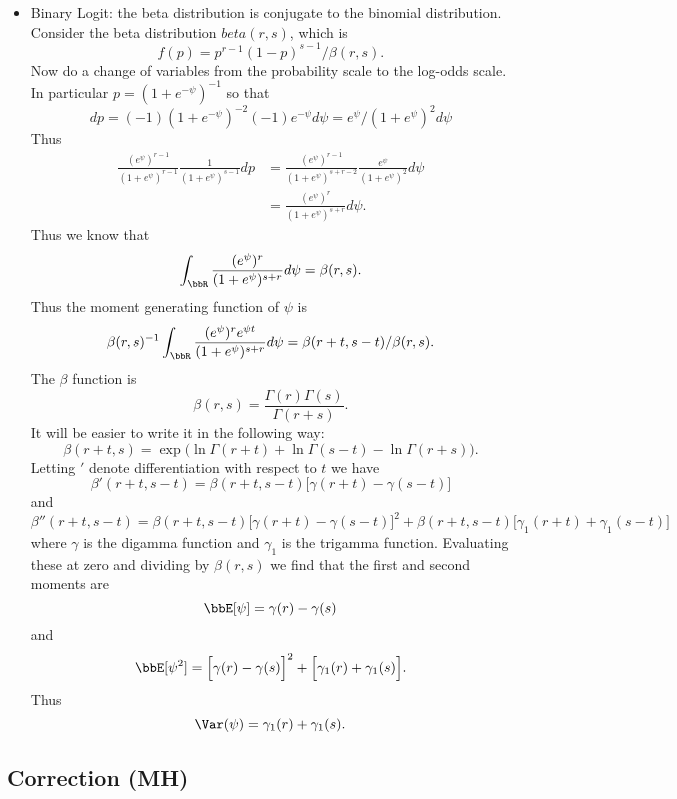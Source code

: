\documentclass{article}
\begin{document}
\begin{itemize}
\item Binary Logit: the beta distribution is conjugate to the binomial
  distribution.  Consider the beta distribution $beta(r, s)$, which is
  \[
  f(p) = p^{r-1} (1-p)^{s-1} / \beta(r, s).
  \]
  Now do a change of variables from the probability scale to the log-odds
  scale.  In particular $p = (1 + e^{-\psi})^{-1}$ so that
  \[
  dp = (-1) (1 + e^{-\psi})^{-2} (-1) e^{-\psi} d \psi = e^{\psi} /
  (1+e^{\psi})^2 d \psi
  \]
  Thus
  \begin{align*}
  \frac{(e^{\psi})^{r-1}}{(1+e^\psi)^{r-1}}  \frac{1}{(1+e^\psi)^{s-1}} d p
  & = 
  \frac{(e^{\psi})^{r-1}}{(1+e^{\psi})^{s+r-2}} \frac{e^{\psi}}{(1+e^{\psi})^2} d
  \psi \\
  & = \frac{(e^{\psi})^{r}}{(1+e^{\psi})^{s+r}} d \psi.
  \end{align*}
  Thus we know that
  \[
  \int_\bbR  \frac{(e^{\psi})^{r}}{(1+e^{\psi})^{s+r}} d \psi = \beta(r, s).
  \]
  Thus the moment generating function of $\psi$ is
  \[
  \beta(r,s)^{-1} \int_{\bbR} \frac{(e^{\psi})^{r}e^{\psi
      t}}{(1+e^{\psi})^{s+r}} d \psi 
  = \beta(r+t, s-t) / \beta(r,s).
  \]
  The $\beta$ function is
  \[
  \beta(r,s) = \frac{\Gamma(r) \Gamma(s)}{\Gamma(r+s)}.
  \]
  It will be easier to write it in the following way:
  \[
  \beta(r+t, s) = \exp \Big( \ln \Gamma(r+t) + \ln \Gamma(s-t) - \ln \Gamma(r+s) \Big).
  \]
  Letting $'$ denote differentiation with respect to $t$ we have
  \[
  \beta'(r+t, s-t) = \beta(r+t, s-t) \Big[ \gamma(r+t) - \gamma(s-t) \Big]
  \]
  and
  \[
  \beta''(r+t, s-t) = \beta(r+t, s-t) \Big[ \gamma(r+t) - \gamma(s-t) \Big]^2
  + \beta(r+t, s-t) \Big[ \gamma_1(r+t) + \gamma_1(s-t) \Big]
  \]
  where $\gamma$ is the digamma function and $\gamma_1$ is the trigamma
  function.  Evaluating these at zero and dividing by $\beta(r,s)$ we find that
  the first and second moments are
  \[
  \bbE[\psi] = \gamma(r) - \gamma(s)
  \]
  and
  \[
  \bbE[\psi^2] = \Big[ \gamma(r) - \gamma(s) \Big]^2
  + \Big[ \gamma_1(r) + \gamma_1(s) \Big].
  \]
  Thus
  \[
  \Var(\psi) = \gamma_1(r) + \gamma_1(s).
  \]



  

\end{itemize}

\subsection{Correction (MH)}
\end{document}
